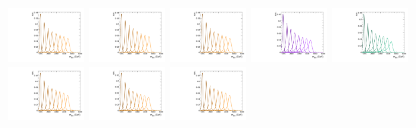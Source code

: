 \begin{figure}[htbp]
  \centering
  \includegraphics[width=0.18\textwidth]{fig/analysisAppendix/templateSignalVsMX_fromDC_GbuToWW_MVV_mu_HP_bb_LDy.pdf}
  \includegraphics[width=0.18\textwidth]{fig/analysisAppendix/templateSignalVsMX_fromDC_RadToWW_MVV_mu_HP_bb_LDy.pdf}
  \includegraphics[width=0.18\textwidth]{fig/analysisAppendix/templateSignalVsMX_fromDC_ZprToWW_MVV_mu_HP_bb_LDy.pdf}
  \includegraphics[width=0.18\textwidth]{fig/analysisAppendix/templateSignalVsMX_fromDC_WprToWZ_MVV_mu_HP_bb_LDy.pdf}
  \includegraphics[width=0.18\textwidth]{fig/analysisAppendix/templateSignalVsMX_fromDC_WprToWH_MVV_mu_HP_bb_LDy.pdf}\\
  \includegraphics[width=0.18\textwidth]{fig/analysisAppendix/templateSignalVsMX_fromDC_GbuToWW_MVV_mu_LP_bb_LDy.pdf}
  \includegraphics[width=0.18\textwidth]{fig/analysisAppendix/templateSignalVsMX_fromDC_RadToWW_MVV_mu_LP_bb_LDy.pdf}
  \includegraphics[width=0.18\textwidth]{fig/analysisAppendix/templateSignalVsMX_fromDC_ZprToWW_MVV_mu_LP_bb_LDy.pdf}

\end{figure}

